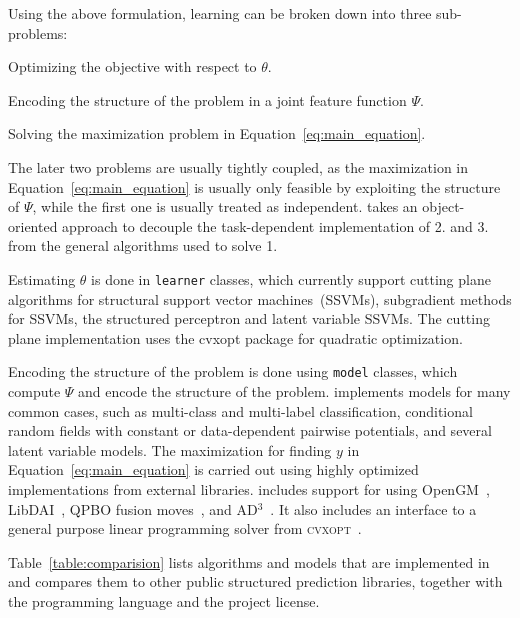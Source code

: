 Using the above formulation, learning can be broken down into three sub-problems:
\begin{enumerate*}
    \item Optimizing the objective with respect to $\theta$.
    \item Encoding the structure of the problem in a joint feature function $\Psi$.
    \item Solving the maximization problem in Equation~\ref{eq:main_equation}.
\end{enumerate*}
The later two problems are usually tightly coupled, as the maximization in
Equation~\ref{eq:main_equation} is usually only feasible by exploiting the
structure of $\Psi$, while the first one is usually treated as independent.
\pystruct takes an object-oriented approach to decouple the task-dependent
implementation of 2. and 3. from the general algorithms used to solve 1.

Estimating $\theta$ is done in \texttt{learner} classes, which currently
support cutting plane algorithms for structural support vector
machines~(SSVMs), subgradient methods for SSVMs, the structured perceptron and
latent variable SSVMs. The cutting plane implementation uses the {\sc cvxopt}
package \citep{dahl2006cvxopt} for quadratic optimization.

Encoding the structure of the problem is done using \texttt{model} classes, which
compute $\Psi$ and encode the structure of the problem.
\pystruct implements models for many common cases, such as multi-class and
multi-label classification, conditional random fields with constant or
data-dependent pairwise potentials, and several latent variable models.
The maximization for finding $y$ in Equation~\ref{eq:main_equation} is carried out
using highly optimized implementations from external libraries. \pystruct
includes support for using {\sc OpenGM}~\citep{kappes2013comparative}, {\sc
LibDAI}~\citep{Mooij_libDAI_10}, QPBO fusion moves~\citep{rother2007optimizing},
and {\sc AD$^3$}~\citep{martins2011augmented}. It also includes an interface to
a general purpose linear programming solver from \textsc{cvxopt}~\cite{dahl2006cvxopt}.

Table~\ref{table:comparision} lists algorithms and models that are implemented in \pystruct and
compares them to other public structured prediction libraries, together with
the programming language and the project license.


